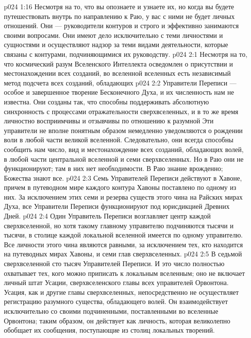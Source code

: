 \vs p024 1:16 Несмотря на то, что вы опознаете и узнаете их, но когда вы будете путешествовать внутрь по направлению к Раю, у вас с ними не будет личных отношений. Они --- руководители контуров и строго и эффективно занимаются своими вопросами. Они имеют дело исключительно с теми личностями и сущностями и осуществляют надзор за теми видами деятельности, которые связаны с контурами, подчиняющимися их руководству.
\vs p024 2:1 Несмотря на то, что космический разум Вселенского Интеллекта осведомлен о присутствии и местонахождении всех  созданий, во вселенной вселенных есть независимый метод подсчета всех созданий, обладающих 
\vs p024 2:2 Управители Переписи --- особое и завершенное творение Бесконечного Духа, и их численность нам не известна. Они созданы так, что способны поддерживать абсолютную синхронность с процессами отражательности сверхвселенных, и в то же время личностно восприимчивы и отзывчивы по отношению к разумной  Эти управители не вполне понятным образом немедленно уведомляются о рождении воли в любой части великой вселенной. Следовательно, они всегда способны сообщить нам число, вид и местонахождение всех созданий, обладающих волей, в любой части центральной вселенной и семи сверхвселенных. Но в Раю они не функционируют; там в них нет необходимости. В Раю знание врожденно; Божества знают все.
\vs p024 2:3 \pc Семь Управителей Переписи действуют в Хавоне, причем в путеводном мире каждого контура Хавоны поставлено по одному из них. За исключением этих семи и резерва существ этого чина на Райских мирах Духа, все Управители Переписи функционируют под юрисдикцией Древних Дней.
\vs p024 2:4 Один Управитель Переписи возглавляет центр каждой сверхвселенной, но хотя такому главному управителю подчиняются тысячи и тысячи, в столице каждой локальной вселенной имеется по одному управителю. Все личности этого чина являются равными, за исключением тех, кто находится на путеводных мирах Хавоны, и семи глав сверхвселенных.
\vs p024 2:5 В седьмой сверхвселенной сто тысяч Управителей Переписи. И это число полностью охватывает тех, кого можно приписать к локальным вселенным; оно не включает личный штат Усации, сверхвселенского главы всех управителей Орвонтона. Усация, как и другие главы сверхвселенных, непосредственно не осуществляет регистрацию разумного существа, обладающего волей. Он взаимодействует исключительно со своими подчиненными, поставленными во вселенные Орвонтона; таким образом, он действует как личность, которая великолепно обобщает их сообщения, поступающие из столиц локальных творений.
